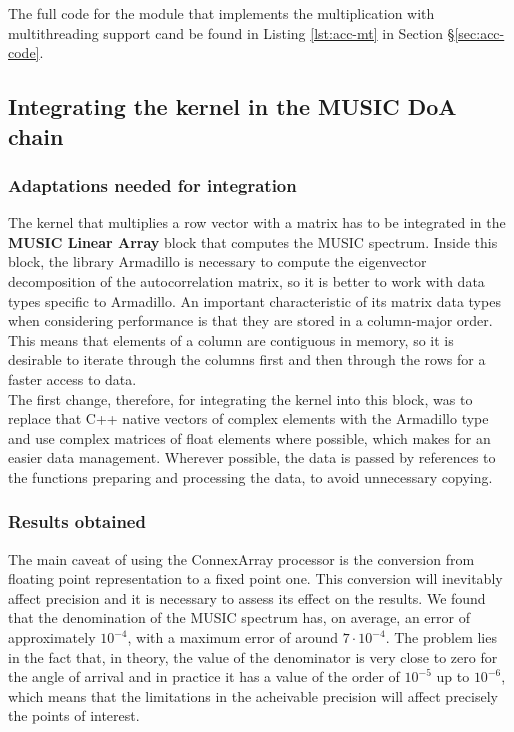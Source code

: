 The full code for the module that implements the multiplication with
multithreading support cand be found in Listing \ref{lst:acc-mt} in Section
\S\ref{sec:acc-code}. \\

\subsection{Integrating the kernel in the MUSIC DoA chain}

\subsubsection{Adaptations needed for integration}
The kernel that multiplies a row vector with a matrix has to be integrated in
the \textbf{MUSIC Linear Array} block that computes the MUSIC spectrum. Inside
this block, the library Armadillo is necessary to compute the eigenvector
decomposition of the autocorrelation matrix, so it is better to work with data
types specific to Armadillo. An important characteristic of its matrix data
types when considering performance is that they are stored in a column-major
order. This means that elements of a column are contiguous in
memory, so it is desirable to iterate through the columns first and then through
the rows for a faster access to data. \\

The first change, therefore, for integrating the kernel into this block, was to
replace that C++ native vectors of complex elements with the Armadillo
 type and use complex matrices of float elements 
where possible, which makes for an easier data management. Wherever possible,
the data is passed by references to the functions preparing and processing the
data, to avoid unnecessary copying.


\subsubsection{Results obtained}

The main caveat of using the ConnexArray processor is the conversion from
floating point representation to a fixed point one. This conversion will
inevitably affect precision and it is necessary to assess its effect on the
results. We found that the denomination of the MUSIC spectrum has, on average,
an error of approximately $10^{-4}$, with a maximum error of around $7 \cdot 10^{-4}$.
The problem lies in the fact that, in theory, the value of the denominator is
very close to zero for the angle of arrival and in practice it has a value of
the order of $10^{-5}$ up to $10^{-6}$, which means that the limitations in the
acheivable precision will affect precisely the points of interest. \\

